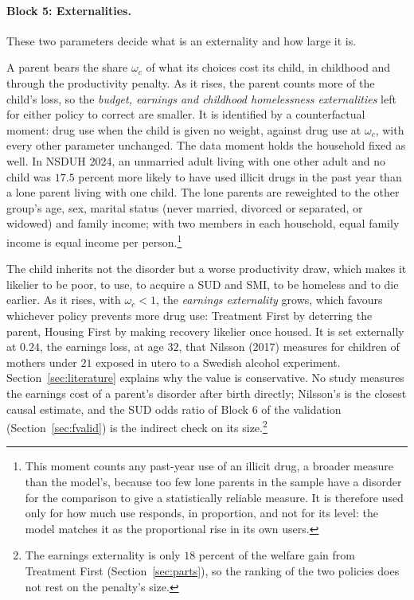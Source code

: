 \documentclass[10pt]{article}
\begin{document}
\paragraph{Block 5: Externalities.} These two parameters decide what is an externality and how large it is.

\begin{description}\setlength{\itemsep}{0.25em}\setlength{\parskip}{0em}
\item[$\omega_c$, the parent's weight on its child.] A parent bears the share $\omega_c$ of what its choices cost its child, in childhood and through the productivity penalty. As it rises, the parent counts more of the child's loss, so the \emph{budget, earnings and childhood homelessness externalities} left for either policy to correct are smaller. It is identified by a counterfactual moment: drug use when the child is given no weight, against drug use at $\omega_c$, with every other parameter unchanged.  The data moment holds the household fixed as well. In NSDUH 2024, an unmarried adult living with one other adult and no child was $17.5$ percent more likely to have used illicit drugs in the past year than a lone parent living with one child. The lone parents are reweighted to the other group's age, sex, marital status (never married, divorced or separated, or widowed) and family income; with two members in each household, equal family income is equal income per person.\footnote{This moment counts any past-year use of an illicit drug, a broader measure than the model's, because too few lone parents in the sample have a disorder for the comparison to give a statistically reliable measure. It is therefore used only for how much use responds, in proportion, and not for its level: the model matches it as the proportional rise in its own users.}
\item[$\delta_d$, earnings the child loses because of a parent's SUD.] The child inherits not the disorder but a worse productivity draw, which makes it likelier to be poor, to use, to acquire a SUD and SMI, to be homeless and to die earlier. As it rises, with $\omega_c<1$, the \emph{earnings externality} grows, which favours whichever policy prevents more drug use: Treatment First by deterring the parent, Housing First by making recovery likelier once housed. It is set externally at $0.24$, the earnings loss, at age $32$, that Nilsson (2017) measures for children of mothers under $21$ exposed in utero to a Swedish alcohol experiment. Section~\ref{sec:literature} explains why the value is conservative. No study measures the earnings cost of a parent's disorder after birth directly; Nilsson's is the closest causal estimate, and the SUD odds ratio of Block 6 of the validation (Section~\ref{sec:fvalid}) is the indirect check on its size.\footnote{The earnings externality is only $18$ percent of the welfare gain from Treatment First (Section~\ref{sec:parts}), so the ranking of the two policies does not rest on the penalty's size.}
\end{description}
\end{document}
